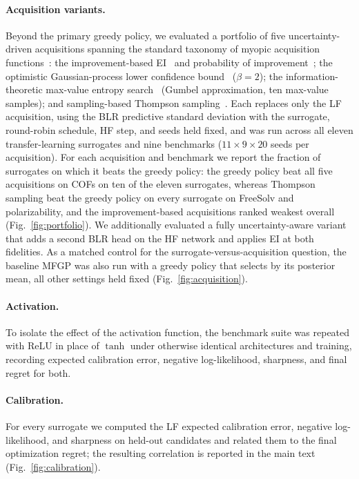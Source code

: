 \documentclass[11pt,a4paper]{article}%
\begin{document}
\paragraph{Acquisition variants.} Beyond the primary greedy policy, we evaluated a
portfolio of five uncertainty-driven acquisitions spanning the standard taxonomy of myopic
acquisition functions~\citep{shahriari2015taking}: the improvement-based EI~\citep{jones1998efficient} and probability of
improvement~\citep{kushner1964new}; the optimistic Gaussian-process lower confidence
bound~\citep{srinivas2012information} ($\beta=2$); the information-theoretic max-value
entropy search~\citep{wang2017max} (Gumbel approximation, ten max-value samples); and
sampling-based Thompson sampling~\citep{russo2018tutorial}. Each replaces only the
LF acquisition, using the BLR predictive standard deviation with the surrogate,
round-robin schedule, HF step, and seeds held fixed, and was run across all
eleven transfer-learning surrogates and nine benchmarks ($11\times 9\times 20$ seeds per
acquisition). For each acquisition and benchmark we report the fraction of surrogates on
which it beats the greedy policy: the greedy policy beat all five acquisitions on COFs on ten of the
eleven surrogates, whereas Thompson sampling beat the greedy policy on every surrogate on FreeSolv and
polarizability, and the improvement-based acquisitions ranked weakest overall
(Fig.~\ref{fig:portfolio}). We additionally evaluated a fully uncertainty-aware variant
that adds a second BLR head on the HF network and applies EI at both fidelities.
As a matched control for the surrogate-versus-acquisition question, the baseline MFGP was also run
with a greedy policy that selects by its posterior mean, all other settings held fixed
(Fig.~\ref{fig:acquisition}).

\paragraph{Activation.} To isolate the effect of the activation function, the benchmark
suite was repeated with ReLU in place of $\tanh$ under otherwise identical architectures
and training, recording expected calibration error, negative log-likelihood, sharpness,
and final regret for both.

\paragraph{Calibration.} For every surrogate we computed the LF expected
calibration error, negative log-likelihood, and sharpness on held-out candidates and
related them to the final optimization regret; the resulting correlation is reported in
the main text (Fig.~\ref{fig:calibration}).
\end{document}
